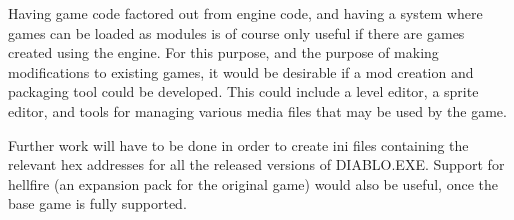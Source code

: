  	Having game code factored out from engine code, and having a system where games can be loaded as modules is of course only useful if there are games created using the engine. For this purpose, and the purpose of making modifications to existing games, it would be desirable if a mod creation and packaging tool could be developed.
 	This could include a level editor, a sprite editor, and tools for managing various media files that may be used by the game.
 	
 	Further work will have to be done in order to create ini files containing the relevant hex addresses for all the released versions of DIABLO.EXE. Support for hellfire (an expansion pack for the original game) would also be useful, once the base game is fully supported.
	
